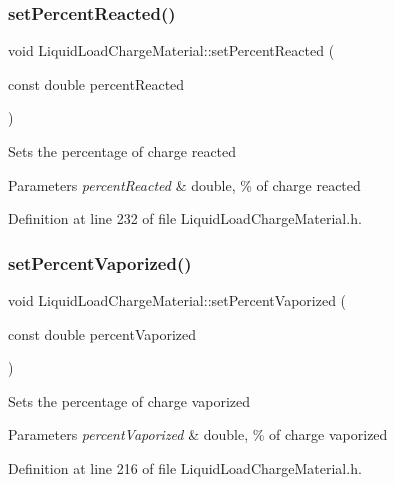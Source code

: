 \subsubsection{\texorpdfstring{set\+Percent\+Reacted()}{setPercentReacted()}}
{\footnotesize\ttfamily void Liquid\+Load\+Charge\+Material\+::set\+Percent\+Reacted (\begin{DoxyParamCaption}\item[{const double}]{percent\+Reacted }\end{DoxyParamCaption})\hspace{0.3cm}{\ttfamily [inline]}}

Sets the percentage of charge reacted 
\begin{DoxyParams}{Parameters}
{\em percent\+Reacted} & double, \% of charge reacted \\
\hline
\end{DoxyParams}


Definition at line 232 of file Liquid\+Load\+Charge\+Material.\+h.

\mbox{\label{class_liquid_load_charge_material_aaf2aa3303201370a7b79e5b3f54e135a}} 
\subsubsection{\texorpdfstring{set\+Percent\+Vaporized()}{setPercentVaporized()}}
{\footnotesize\ttfamily void Liquid\+Load\+Charge\+Material\+::set\+Percent\+Vaporized (\begin{DoxyParamCaption}\item[{const double}]{percent\+Vaporized }\end{DoxyParamCaption})\hspace{0.3cm}{\ttfamily [inline]}}

Sets the percentage of charge vaporized 
\begin{DoxyParams}{Parameters}
{\em percent\+Vaporized} & double, \% of charge vaporized \\
\hline
\end{DoxyParams}


Definition at line 216 of file Liquid\+Load\+Charge\+Material.\+h.

\mbox{\label{class_liquid_load_charge_material_a793c7ebc2643b2af0eaf21b9cb788775}} 
